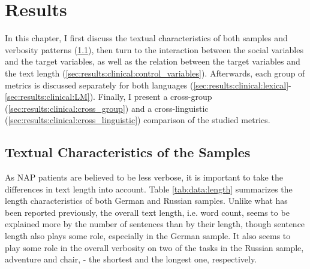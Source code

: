 
\chapter{Results}
\label{chap:4:results}

\label{sec:results:clinical}

In this chapter, I first discuss the textual characteristics of both samples and verbosity patterns (\ref{sec:results:clinical:sample_length}), then turn to the interaction between the social variables and the target variables, as well as the relation between the target variables and the text length (\ref{sec:results:clinical:control_variables}). Afterwards, each group of metrics is discussed separately for both languages (\ref{sec:results:clinical:lexical}-\ref{sec:results:clinical:LM}). Finally, I present a cross-group (\ref{sec:results:clinical:cross_group}) and a cross-linguistic (\ref{sec:results:clinical:cross_linguistic}) comparison of the studied metrics.

\section{Textual Characteristics of the Samples}
\label{sec:results:clinical:sample_length}

As NAP patients are believed to be less verbose, it is important to take the differences in text length into account. Table \ref{tab:data:length} summarizes the length characteristics of both German and Russian samples. Unlike what has been reported previously, the overall text length, i.e. word count, seems to be explained more by the number of sentences than by their length, though sentence length also plays some role, especially in the German sample. It also seems to play some role in the overall verbosity on two of the tasks in the Russian sample, adventure and chair, - the shortest and the longest one, respectively. 

